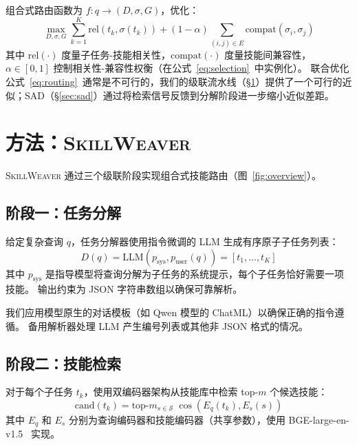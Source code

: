 \documentclass[11pt,a4paper]{ctexart}
\newcommand{\system}{\textsc{SkillWeaver}}
\begin{document}
组合式路由函数为 $f: q \to (D, \sigma, G)$，优化：
\begin{equation}
\max_{D, \sigma, G} \sum_{k=1}^{K} \text{rel}(t_k, \sigma(t_k)) + (1\!-\!\alpha) \!\!\!\sum_{(i,j) \in E}\!\!\! \text{compat}(\sigma_i, \sigma_j)
\label{eq:routing}
\end{equation}
其中 $\text{rel}(\cdot)$ 度量子任务-技能相关性，$\text{compat}(\cdot)$ 度量技能间兼容性，$\alpha \in [0, 1]$ 控制相关性-兼容性权衡（在公式~\ref{eq:selection}~中实例化）。
联合优化公式~\ref{eq:routing}~通常是不可行的，我们的级联流水线（\S\ref{sec:method}）提供了一个可行的近似；SAD（\S\ref{sec:sad}）通过将检索信号反馈到分解阶段进一步缩小近似差距。

\section{方法：\system{}}
\label{sec:method}

\system{} 通过三个级联阶段实现组合式技能路由（图~\ref{fig:overview}）。

\subsection{阶段一：任务分解}

给定复杂查询 $q$，任务分解器使用指令微调的 LLM 生成有序原子子任务列表：
\begin{equation}
D(q) = \text{LLM}(p_{\text{sys}}, p_{\text{user}}(q)) = [t_1, \ldots, t_K]
\end{equation}
其中 $p_{\text{sys}}$ 是指导模型将查询分解为子任务的系统提示，每个子任务恰好需要一项技能。
输出约束为 JSON 字符串数组以确保可靠解析。

我们应用模型原生的对话模板（如 Qwen 模型的 ChatML）以确保正确的指令遵循。
备用解析器处理 LLM 产生编号列表或其他非 JSON 格式的情况。

\subsection{阶段二：技能检索}

对于每个子任务 $t_k$，使用双编码器架构从技能库中检索 top-$m$ 个候选技能：
\begin{equation}
\text{cand}(t_k) = \text{top-}m_{s \in \mathcal{S}} \; \cos(E_q(t_k), E_s(s))
\end{equation}
其中 $E_q$ 和 $E_s$ 分别为查询编码器和技能编码器（共享参数），使用 BGE-large-en-v1.5~\citep{xiao2023bge} 实现。
\end{document}
